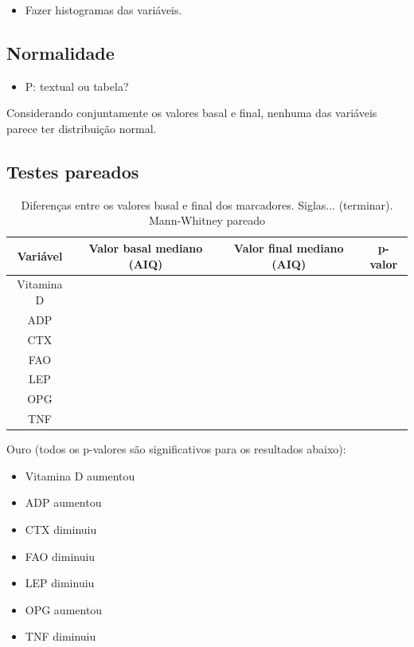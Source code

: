 \documentclass[a4paper]{article}
\begin{document}
\begin{itemize}
\item Fazer histogramas das variáveis.
\end{itemize}

\newpage
\subsection{Normalidade}

\begin{itemize}
\item P: textual ou tabela?
\end{itemize}

Considerando conjuntamente os valores basal e final, nenhuma das variáveis parece ter distribuição normal.

\newpage
\subsection{Testes pareados}
\label{sec:pareados}

\begin{table}[!h]
  \centering
  \begin{tabular}{c|cc|c}
    \hline
    Variável&Valor basal mediano (AIQ) &Valor final mediano (AIQ) &p-valor\\
    \hline
    \hline
    Vitamina D&&&\\
\hline
    ADP&&&\\
    CTX&&&\\
    FAO&&&\\
    LEP&&&\\
    OPG&&&\\
    TNF&&&\\
    \hline
  \end{tabular}
  \caption[Diferenças entre os valores basal e final dos marcadores]{Diferenças entre os valores basal e final dos marcadores. Siglas... (terminar). Mann-Whitney pareado}
  \label{tab:testes-pareados}
\end{table}

Ouro (todos os p-valores são significativos para os resultados abaixo):

\begin{itemize}
\item Vitamina D aumentou
\item ADP aumentou
\item CTX diminuiu
\item FAO diminuiu
\item LEP diminuiu
\item OPG aumentou
\item TNF diminuiu
\end{itemize}
\end{document}
